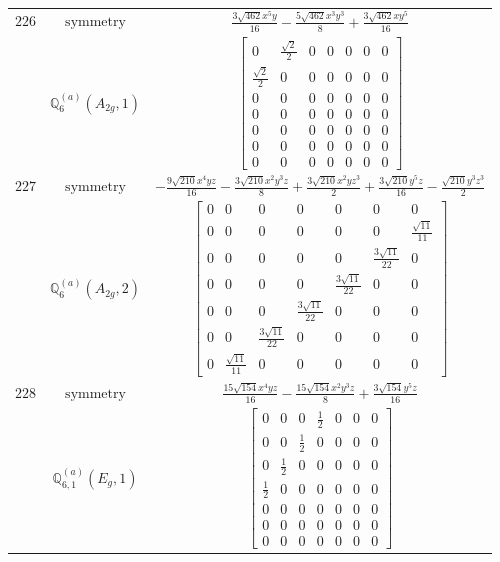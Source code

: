 \documentclass[fleqn,8pt,landscape]{jsarticle}
\begin{document}
\begin{longtable}{ccc}
$ 226 $ & $ \text{symmetry} $ & $ \frac{3 \sqrt{462} x^{5} y}{16} - \frac{5 \sqrt{462} x^{3} y^{3}}{8} + \frac{3 \sqrt{462} x y^{5}}{16} $ \\
$  $ & $ \mathbb{Q}_{6}^{(a)}(A_{2g},1) $ & $ \begin{bmatrix} 0 & \frac{\sqrt{2}}{2} & 0 & 0 & 0 & 0 & 0 \\ \frac{\sqrt{2}}{2} & 0 & 0 & 0 & 0 & 0 & 0 \\ 0 & 0 & 0 & 0 & 0 & 0 & 0 \\ 0 & 0 & 0 & 0 & 0 & 0 & 0 \\ 0 & 0 & 0 & 0 & 0 & 0 & 0 \\ 0 & 0 & 0 & 0 & 0 & 0 & 0 \\ 0 & 0 & 0 & 0 & 0 & 0 & 0 \end{bmatrix} $ \\ \hline
$ 227 $ & $ \text{symmetry} $ & $ - \frac{9 \sqrt{210} x^{4} y z}{16} - \frac{3 \sqrt{210} x^{2} y^{3} z}{8} + \frac{3 \sqrt{210} x^{2} y z^{3}}{2} + \frac{3 \sqrt{210} y^{5} z}{16} - \frac{\sqrt{210} y^{3} z^{3}}{2} $ \\
$  $ & $ \mathbb{Q}_{6}^{(a)}(A_{2g},2) $ & $ \begin{bmatrix} 0 & 0 & 0 & 0 & 0 & 0 & 0 \\ 0 & 0 & 0 & 0 & 0 & 0 & \frac{\sqrt{11}}{11} \\ 0 & 0 & 0 & 0 & 0 & \frac{3 \sqrt{11}}{22} & 0 \\ 0 & 0 & 0 & 0 & \frac{3 \sqrt{11}}{22} & 0 & 0 \\ 0 & 0 & 0 & \frac{3 \sqrt{11}}{22} & 0 & 0 & 0 \\ 0 & 0 & \frac{3 \sqrt{11}}{22} & 0 & 0 & 0 & 0 \\ 0 & \frac{\sqrt{11}}{11} & 0 & 0 & 0 & 0 & 0 \end{bmatrix} $ \\ \hline
$ 228 $ & $ \text{symmetry} $ & $ \frac{15 \sqrt{154} x^{4} y z}{16} - \frac{15 \sqrt{154} x^{2} y^{3} z}{8} + \frac{3 \sqrt{154} y^{5} z}{16} $ \\
$  $ & $ \mathbb{Q}_{6,1}^{(a)}(E_{g},1) $ & $ \begin{bmatrix} 0 & 0 & 0 & \frac{1}{2} & 0 & 0 & 0 \\ 0 & 0 & \frac{1}{2} & 0 & 0 & 0 & 0 \\ 0 & \frac{1}{2} & 0 & 0 & 0 & 0 & 0 \\ \frac{1}{2} & 0 & 0 & 0 & 0 & 0 & 0 \\ 0 & 0 & 0 & 0 & 0 & 0 & 0 \\ 0 & 0 & 0 & 0 & 0 & 0 & 0 \\ 0 & 0 & 0 & 0 & 0 & 0 & 0 \end{bmatrix} $ \\ \hline

\end{longtable}
\end{document}
